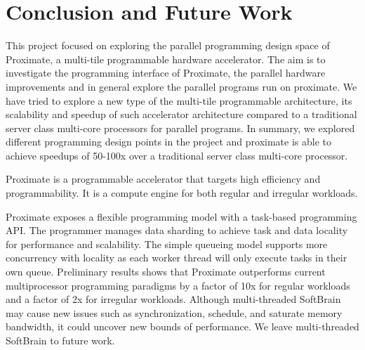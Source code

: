 \section{Conclusion and Future Work} \label{sec:conc}
This project focused on exploring the parallel programming design space
of Proximate, a multi-tile programmable hardware accelerator.
The aim is to investigate the programming interface  of Proximate, the parallel
hardware improvements and in general explore the parallel programs run on proximate.
We have tried to explore a new type of the multi-tile programmable architecture,
its scalability and speedup of such accelerator architecture 
compared to a traditional server class multi-core processors for parallel programs.
In summary, we explored different programming design points in the project and proximate is able to achieve speedups of
50-100x over a traditional server class multi-core processor. 

Proximate is a programmable accelerator that targets high 
efficiency and programmability. It is a compute engine 
for both regular and irregular workloads.

Proximate exposes a flexible  programming model with a task-based programming API. 
The programmer manages data sharding to achieve task and data locality for performance and scalability. 
The simple queueing model supports more concurrency with locality 
as each worker thread will only execute tasks in their own queue. 
Preliminary results shows that Proximate outperforms current 
multiprocessor programming paradigms by a factor of 10x for regular 
workloads and a factor of 2x for irregular workloads. Although
multi-threaded SoftBrain may cause new issues such as synchronization, 
schedule, and saturate memory bandwidth, it could uncover new bounds of performance. We leave multi-threaded SoftBrain to future work. 

